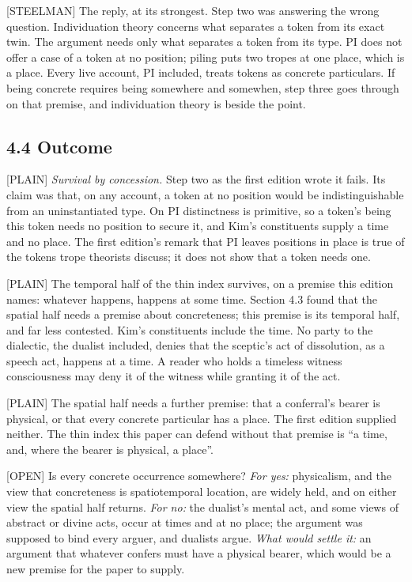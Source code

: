 \documentclass[11pt]{article}
\newcommand{\register}[1]{{\ttfamily\small #1}}
\begin{document}
\register{[STEELMAN]} The reply, at its strongest. Step two was answering the wrong question. Individuation theory concerns what separates a token from its exact twin. The argument needs only what separates a token from its type. PI does not offer a case of a token at no position; piling puts two tropes at one place, which is a place. Every live account, PI included, treats tokens as concrete particulars. If being concrete requires being somewhere and somewhen, step three goes through on that premise, and individuation theory is beside the point.

\subsection*{4.4 Outcome}

\register{[PLAIN]} \emph{Survival by concession.} Step two as the first edition wrote it fails. Its claim was that, on any account, a token at no position would be indistinguishable from an uninstantiated type. On PI distinctness is primitive, so a token's being this token needs no position to secure it, and Kim's constituents supply a time and no place. The first edition's remark that PI leaves positions in place is true of the tokens trope theorists discuss; it does not show that a token needs one.

\register{[PLAIN]} The temporal half of the thin index survives, on a premise this edition names: whatever happens, happens at some time. Section 4.3 found that the spatial half needs a premise about concreteness; this premise is its temporal half, and far less contested. Kim's constituents include the time. No party to the dialectic, the dualist included, denies that the sceptic's act of dissolution, as a speech act, happens at a time. A reader who holds a timeless witness consciousness may deny it of the witness while granting it of the act.

\register{[PLAIN]} The spatial half needs a further premise: that a conferral's bearer is physical, or that every concrete particular has a place. The first edition supplied neither. The thin index this paper can defend without that premise is ``a time, and, where the bearer is physical, a place''.

\register{[OPEN]} Is every concrete occurrence somewhere? \emph{For yes:} physicalism, and the view that concreteness is spatiotemporal location, are widely held, and on either view the spatial half returns. \emph{For no:} the dualist's mental act, and some views of abstract or divine acts, occur at times and at no place; the argument was supposed to bind every arguer, and dualists argue. \emph{What would settle it:} an argument that whatever confers must have a physical bearer, which would be a new premise for the paper to supply.
\end{document}
